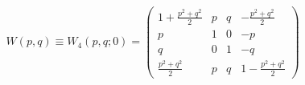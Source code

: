 \begin{equation}
W(p, q) \equiv W_4(p, q;  0) = \left( \begin{array}{cccc}
1+ \frac{p^2 + q^2 }{2} & p & q  & -\frac{p^2 + q^2 }{2} \\
p & 1 & 0 & -p \\
q & 0 & 1 & -q \\
\frac{p^2 + q^2 }{2} &  p & q  & 1 -\frac{p^2 + q^2 }{2}
\end{array}\right)
\label{4}
\end{equation}

